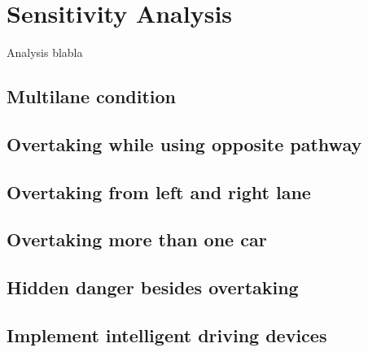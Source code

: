 
\section{Sensitivity Analysis}

Analysis blabla

\subsection{Multilane condition}

\subsection{Overtaking while using opposite pathway}

\subsection{Overtaking from left and right lane}

\subsection{Overtaking more than one car}

\subsection{Hidden danger besides overtaking}

\subsection{Implement intelligent driving devices}

